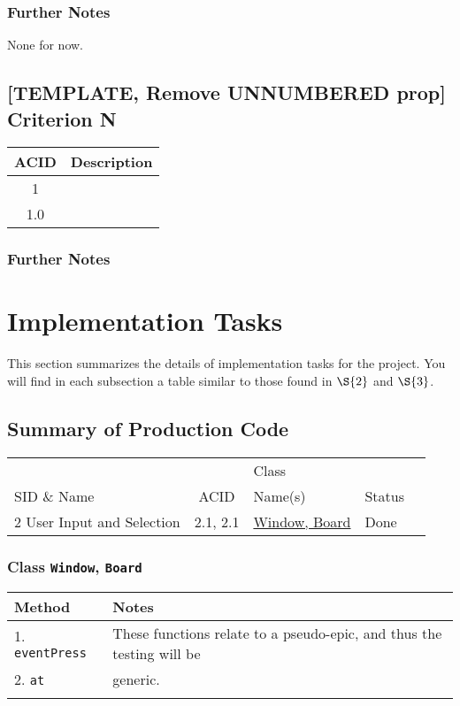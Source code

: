 \documentclass[11pt]{article}
\begin{document}
\subsubsection*{Further Notes}
\label{sec:orga1fc6ec}
None for now.

\subsection*{[TEMPLATE, Remove UNNUMBERED prop] Criterion N}
\label{sec:org26ace21}
\begin{center}
\begin{tabular}{|c|l|}
ACID & Description\\
\hline
1 & \\
\hline
1.0 & \\
\end{tabular}
\end{center}

\subsubsection*{Further Notes}
\label{sec:org441cbfe}
\section{Implementation Tasks}
\label{sec:org9bc794e}
This section summarizes the details of implementation tasks for the project. You will find in each
subsection a table similar to those found in \hyperref[sec:orgc754eda]{\(\S{2}\)} and \hyperref[sec:org17bd791]{\(\S{3}\)}.

\subsection{Summary of Production Code}
\label{sec:orgdea505c}

\begin{center}
\begin{tabular}{|p{4.5cm}|c|p{3.5cm}|p{4.5cm}|c|}
 &  & Class & \\
SID \& Name & ACID & Name(s) & Status\\
\hline
2 User Input and Selection & 2.1, 2.1 & \hyperref[sec:org2bc0459]{Window, Board} & Done\\
\end{tabular}
\end{center}



\subsubsection{Class \texttt{Window}, \texttt{Board}}
\label{sec:org2bc0459}
\begin{center}
\begin{tabular}{|l|l|}
Method & Notes\\
\hline
1. \texttt{eventPress} & These functions relate to a pseudo-epic, and thus the testing will be\\
2. \texttt{at} & generic.\\
 & \\
\end{tabular}
\end{center}
\end{document}
